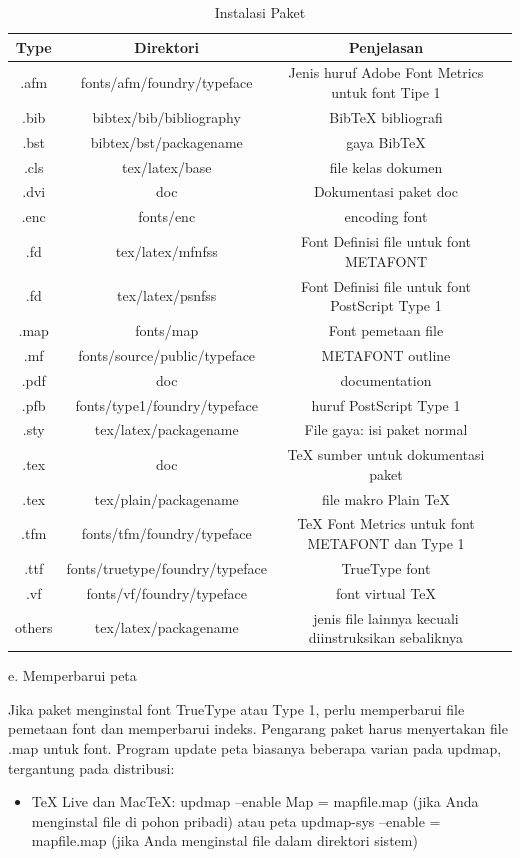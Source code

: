 \begin{enumerate}
\begin{table}[ht]
	\caption{Instalasi Paket}
	\centering
	\begin{tabular}{cccc}
		\hline
		Type&Direktori&Penjelasan&\\
		\hline
		.afm&fonts/afm/foundry/typeface&Jenis huruf Adobe Font Metrics untuk font Tipe 1&\\
		.bib&bibtex/bib/bibliography&BibTeX bibliografi&\\
		.bst&bibtex/bst/packagename& gaya BibTeX&\\
		.cls&tex/latex/base& file kelas dokumen&\\
		.dvi&doc&Dokumentasi paket doc&\\
		.enc&fonts/enc&encoding font&\\
		.fd&tex/latex/mfnfss&Font Definisi file untuk font METAFONT&\\
		.fd&tex/latex/psnfss& Font Definisi file untuk font PostScript Type 1&\\
		.map&fonts/map&Font pemetaan file&\\
		.mf&fonts/source/public/typeface&METAFONT outline&\\
		.pdf&doc&documentation&\\
		.pfb&fonts/type1/foundry/typeface&huruf PostScript Type 1&\\
		.sty&tex/latex/packagename&File gaya: isi paket normal&\\
		.tex&doc&TeX sumber untuk dokumentasi paket&\\
		.tex&tex/plain/packagename&file makro Plain TeX&\\
		.tfm&fonts/tfm/foundry/typeface&TeX Font Metrics untuk font METAFONT dan Type 1&\\
		.ttf&fonts/truetype/foundry/typeface&TrueType font&\\
		.vf&fonts/vf/foundry/typeface&font virtual TeX&\\
	    others&tex/latex/packagename&jenis file lainnya kecuali diinstruksikan sebaliknya&\\		
		\hline
	\end{tabular}
\end{table}

\vspace{12pt} \par 
\noindent e. Memperbarui peta \par
\hspace{0.50in} Jika paket menginstal font TrueType atau Type 1, perlu memperbarui file pemetaan font dan memperbarui indeks. Pengarang paket harus menyertakan file .map untuk font. Program update peta biasanya beberapa varian pada updmap, tergantung pada distribusi: 
\begin{itemize}
\item TeX Live dan MacTeX: updmap --enable Map = mapfile.map (jika Anda menginstal file di pohon pribadi) atau peta updmap-sys --enable = mapfile.map (jika Anda menginstal file dalam direktori sistem) \par


\end{itemize}
\end{enumerate}
